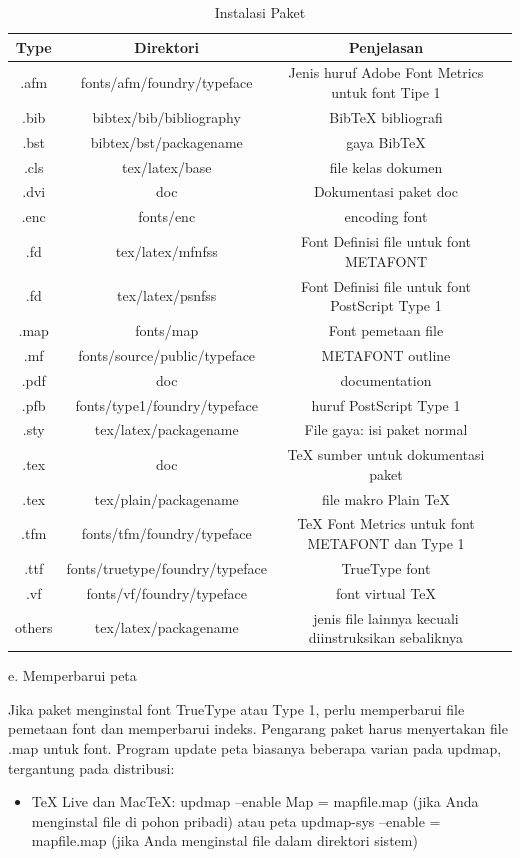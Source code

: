 \begin{enumerate}
\begin{table}[ht]
	\caption{Instalasi Paket}
	\centering
	\begin{tabular}{cccc}
		\hline
		Type&Direktori&Penjelasan&\\
		\hline
		.afm&fonts/afm/foundry/typeface&Jenis huruf Adobe Font Metrics untuk font Tipe 1&\\
		.bib&bibtex/bib/bibliography&BibTeX bibliografi&\\
		.bst&bibtex/bst/packagename& gaya BibTeX&\\
		.cls&tex/latex/base& file kelas dokumen&\\
		.dvi&doc&Dokumentasi paket doc&\\
		.enc&fonts/enc&encoding font&\\
		.fd&tex/latex/mfnfss&Font Definisi file untuk font METAFONT&\\
		.fd&tex/latex/psnfss& Font Definisi file untuk font PostScript Type 1&\\
		.map&fonts/map&Font pemetaan file&\\
		.mf&fonts/source/public/typeface&METAFONT outline&\\
		.pdf&doc&documentation&\\
		.pfb&fonts/type1/foundry/typeface&huruf PostScript Type 1&\\
		.sty&tex/latex/packagename&File gaya: isi paket normal&\\
		.tex&doc&TeX sumber untuk dokumentasi paket&\\
		.tex&tex/plain/packagename&file makro Plain TeX&\\
		.tfm&fonts/tfm/foundry/typeface&TeX Font Metrics untuk font METAFONT dan Type 1&\\
		.ttf&fonts/truetype/foundry/typeface&TrueType font&\\
		.vf&fonts/vf/foundry/typeface&font virtual TeX&\\
	    others&tex/latex/packagename&jenis file lainnya kecuali diinstruksikan sebaliknya&\\		
		\hline
	\end{tabular}
\end{table}

\vspace{12pt} \par 
\noindent e. Memperbarui peta \par
\hspace{0.50in} Jika paket menginstal font TrueType atau Type 1, perlu memperbarui file pemetaan font dan memperbarui indeks. Pengarang paket harus menyertakan file .map untuk font. Program update peta biasanya beberapa varian pada updmap, tergantung pada distribusi: 
\begin{itemize}
\item TeX Live dan MacTeX: updmap --enable Map = mapfile.map (jika Anda menginstal file di pohon pribadi) atau peta updmap-sys --enable = mapfile.map (jika Anda menginstal file dalam direktori sistem) \par


\end{itemize}
\end{enumerate}
